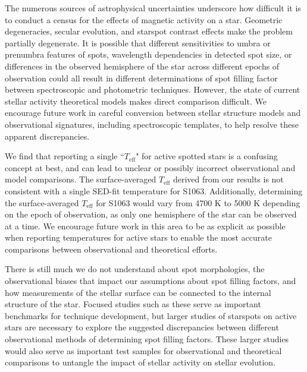 \documentclass[trackchanges]{aastex631}
\begin{document}
The numerous sources of astrophysical uncertainties underscore how difficult it is to conduct a census for the effects of magnetic activity on a star.  Geometric degeneracies, secular evolution, and starspot contrast effects make the problem partially degenerate.  It is possible that different sensitivities to umbra or prenumbra features of spots, wavelength dependencies in detected spot size, or differences in the observed hemisphere of the star across different epochs of observation could all result in different determinations of spot filling factor between spectroscopic and photometric techniques. However, the state of current stellar activity theoretical models makes direct comparison difficult. We encourage future work in careful conversion between stellar structure models and observational signatures, including spectroscopic templates, to help resolve these apparent discrepancies. %

We find that reporting a single ``$T_{\mathrm{eff}}$" for active spotted stars is a confusing concept at best, and can lead to unclear or possibly incorrect observational and model comparisons. The surface-averaged $T_{\mathrm{eff}}$ derived from our results is not consistent with a single SED-fit temperature for S1063. Additionally, determining the surface-averaged $T_{\mathrm{eff}}$ for S1063 would vary from 4700 K to 5000 K depending on the epoch of observation, as only one hemisphere of the star can be observed at a time. We encourage future work in this area to be as explicit as possible when reporting temperatures for active stars to enable the most accurate comparisons between observational and theoretical efforts.

There is still much we do not understand about spot morphologies, the observational biases that impact our assumptions about spot filling factors, and how measurements of the stellar surface can be connected to the internal structure of the star. Focused studies such as these serve as important benchmarks for technique development, but larger studies of starspots on active stars are necessary to explore the suggested discrepancies between different observational methods of determining spot filling factors. These larger studies would also serve as important test samples for observational and theoretical comparisons to untangle the impact of stellar activity on stellar evolution.
\end{document}
